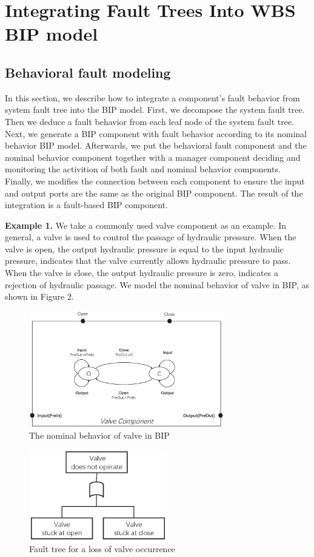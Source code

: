 \documentclass[conference]{IEEEtran}
\begin{document}
\section{Integrating Fault Trees Into WBS BIP model}

\subsection{Behavioral fault modeling}
In this section, we describe how to integrate a component's fault behavior from system fault tree into the BIP model. First, we decompose the system fault tree. Then we deduce a fault behavior from each leaf node of the system fault tree. Next, we generate a BIP component with fault behavior according to its nominal behavior BIP model. Afterwards, we put the behavioral fault component and the nominal behavior component together with a manager component deciding and monitoring the activition of both fault and nominal behavior components. Finally, we modifies the connection between each component to ensure the input and output ports are the same as the original BIP component. The result of the integration is a fault-based BIP component.

\textbf{Example 1.} We take a commonly used valve component as an example. In general, a valve is used to control the passage of hydraulic pressure. When the valve is open, the output hydraulic pressure is equal to the input hydraulic pressure, indicates that the valve currently allows hydraulic pressure to pass. When the valve is close, the output hydraulic pressure is zero, indicates a rejection of hydraulic passage. We model the nominal behavior of valve in BIP, as shown in Figure 2.

\begin{figure}[htbp]
	\centerline{\includegraphics[width=85mm]{figure/example_origin.eps}}
	\caption{The nominal behavior of valve in BIP}
	\label{example_BIP_nominal}
\end{figure}

\begin{figure}[htbp]
	\centerline{\includegraphics[width=60mm]{figure/example_fault_tree.eps}}
	\caption{Fault tree for a loss of valve occurrence}
	\label{example_BIP_nominal}
\end{figure}
\end{document}
